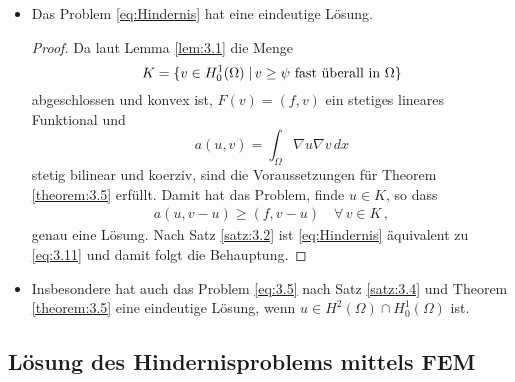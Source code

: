 \begin{itemize}
\begin{proof}
Insgesamt gibt es also für das Problem \eqref{eq:3.7} genau eine  Lösung.
\end{proof}

\item \begin{kor}
Das Problem \eqref{eq:Hindernis} hat eine eindeutige Lösung.
\end{kor}

\begin{proof}
Da laut Lemma \ref{lem:3.1} die Menge 
\[
	K=\{v \in H^1_0(\Omega) \;\vert\, v \ge \psi \text{ fast überall in }\Omega\}
\]
abgeschlossen und konvex ist, $F(v) = (f,v)$ ein stetiges lineares Funktional und 
\[
	a(u,v) = \int_\Omega \nabla u \nabla v \, dx
\]
stetig bilinear und koerziv, sind die Voraussetzungen für Theorem \ref{theorem:3.5} erfüllt. Damit hat das Problem, finde $u \in K$, so dass
\begin{align}\label{eq:3.11}
	a(u,v-u) \ge (f,v-u) \quad \forall \, v \in K \, ,
\end{align}
genau eine Lösung. Nach Satz \ref{satz:3.2} ist \eqref{eq:Hindernis} äquivalent zu \eqref{eq:3.11} und damit folgt die Behauptung.
\end{proof}

\item \begin{bem}
Insbesondere hat auch das Problem \eqref{eq:3.5} nach Satz \ref{satz:3.4} und Theorem \ref{theorem:3.5} eine eindeutige Lösung, wenn $u \in H^2(\Omega) \cap H^1_0(\Omega)$ ist.
\end{bem}
\end{itemize}







\subsection{Lösung des Hindernisproblems mittels FEM}
\label{kap:3.1.3}

